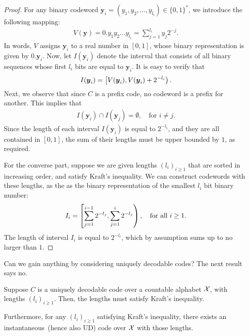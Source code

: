     \begin{proof}
        For any binary codeword $\boldsymbol{y}_i = (y_1, y_2, \ldots, y_{l_i}) \in \{0, 1\}^*$, we introduce the following mapping: 
        \begin{align}
            V(\boldsymbol{y}) = 0.y_1y_2 \ldots y_{l_i} = \sum_{j=1}^{l_i} y_j 2^{-j}.    
        \end{align}
        In words, $V$ assigns $\boldsymbol{y}_i$ to a real number in $[0, 1]$, whose binary representation is given by $0.\boldsymbol{y}_i$. Now, let $I(\boldsymbol{y}_i)$ denote the interval that consists of all binary sequences whose first $l_i$ bits are equal to $\boldsymbol{y}_i$. It is easy to verify that 
        \begin{align}
            I(\boldsymbol{y}_i) = \left[ V(\boldsymbol{y}_i), V(\boldsymbol{y}_i) + 2^{-l_i} \right).  
        \end{align}
        Next, we observe that since $C$ is a prefix code, no codeword is a prefix for another. This implies that 
        \begin{align}
            I(\boldsymbol{y}_i) \cap I(\boldsymbol{y}_j) = \emptyset, \quad \text{for } i \neq j. 
        \end{align}
        Since the length of each interval $I(\boldsymbol{y}_i)$ is equal to $2^{-l_i}$, and they are all contained in $[0, 1]$, the sum of their lengths must be upper bounded by $1$, as required. 

        For the converse part, suppose we are given lengths $(l_i)_{i \geq 1}$ that are sorted in increasing order, and satisfy Kraft's inequality.  We can construct codewords with these lengths, as the as the binary representation of the smallest $l_i$ bit binary number: 
        \begin{align}
            I_i = \left[ \sum_{j=1}^{i-1} 2^{-l_j}, \sum_{j=1}^{i} 2^{-l_j} \right), \quad \text{for all } i \geq 1.  
        \end{align}
        The length of interval $I_i$ is equal to $2^{-l_i}$, which by assumption sums up to no larger than $1$. 
    \end{proof}

    Can we gain anything by considering uniquely decodable codes? The next result says no. 
    \begin{theorem}
        \label{thm:kraft-ud-1} 
        Suppose $C$ is a uniquely decodable code over a countable alphabet $\mathcal{X}$, with lengths $(l_i)_{i \geq 1}$. Then, the lengths must satisfy Kraft's inequality. 

        Furthermore, for any $(l_i)_{i \geq 1}$ satisfying Kraft's inequality, there exists an instantaneous~(hence also UD) code over $\mathcal{X}$ with those lengths. 
    \end{theorem}


